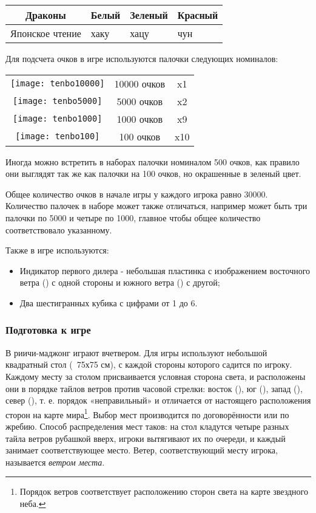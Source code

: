 \begin{tabular}{ |c|C{2cm}|C{2cm}|C{2cm}| } 
	\hline
	 \rule[0ex]{0pt}{7ex} Драконы &  \newline Белый &  \newline Зеленый &  \newline Красный \\
	\hline
	Японское чтение & хаку & хацу & чун \\
	\hline
\end{tabular}

Для подсчета очков в игре используются палочки следующих номиналов:

\begin{tabular}{ |c|c|c| } 
	\hline
	\texttt{[image: tenbo10000]} & 10000 очков & x1 \\
	\texttt{[image: tenbo5000]} & 5000 очков & x2 \\
	\texttt{[image: tenbo1000]} & 1000 очков & x9 \\
	\texttt{[image: tenbo100]} & 100 очков & x10 \\
	\hline
\end{tabular}

Иногда можно встретить в наборах палочки номиналом 500 очков, как правило они выглядят так же как палочки на 100 очков, но окрашенные в зеленый цвет.

Общее количество очков в начале игры у каждого игрока равно 30000. Количество палочек в наборе может также отличаться, например может быть три палочки по 5000 и четыре по 1000, главное чтобы общее количество соответствовало указанному.

Также в игре используются:
\begin{itemize}
	\item Индикатор первого дилера - небольшая пластинка с изображением восточного ветра () с одной стороны и южного ветра () с другой;
	\item Два шестигранных кубика с цифрами от 1 до 6.
\end{itemize}

\subsubsection{Подготовка к игре}

В риичи-маджонг играют вчетвером. Для игры используют небольшой квадратный стол (~75х75 см), с каждой стороны которого садится по игроку. Каждому месту за столом присваивается условная сторона света, и расположены они в порядке тайлов ветров против часовой стрелки: восток (), юг (), запад (), север (), т. е. порядок «неправильный» и отличается от настоящего расположения сторон на карте мира\footnote{Порядок ветров соответствует расположению сторон света на карте звездного неба.}. Выбор мест производится по договорённости или по жребию. Способ распределения мест таков: на стол кладутся четыре разных тайла ветров рубашкой вверх, игроки вытягивают их по очереди, и каждый занимает соответствующее место. Ветер, соответствующий месту игрока, называется \textit{ветром места}. 

